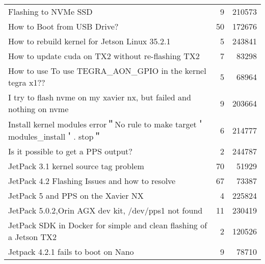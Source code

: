 \begin{longtable}{p{}rr}
    Flashing to NVMe SSD                                                                                                               & 9       & 210573 \\
    How to Boot from USB Drive?                                                                                                        & 50      & 172676 \\
    How to rebuild kernel for Jetson Linux 35.2.1                                                                                      & 5       & 243841 \\
    How to update cuda on TX2 without re-flashing TX2                                                                                  & 7       & 83298  \\
    How to use To use TEGRA\_AON\_GPIO in the kernel tegra x1??                                                                        & 5       & 68964  \\
    I try to flash nvme on my xavier nx, but failed and nothing on nvme                                                                & 9       & 203664 \\
    Install kernel modules error＂No rule to make target＇modules\_install＇. stop＂                                                   & 6       & 214777 \\
    Is it possible to get a PPS output?                                                                                                & 2       & 244787 \\
    JetPack 3.1 kernel source tag problem                                                                                              & 70      & 51929  \\
    JetPack 4.2 Flashing Issues and how to resolve                                                                                     & 67      & 73387  \\
    JetPack 5 and PPS on the Xavier NX                                                                                                 & 4       & 225824 \\
    JetPack 5.0.2,Orin AGX dev kit, /dev/pps1 not found                                                                                & 11      & 230419 \\
    JetPack SDK in Docker for simple and clean flashing of a Jetson TX2                                                                & 2       & 120526 \\
    Jetpack 4.2.1 fails to boot on Nano                                                                                                & 9       & 78710  \\

\end{longtable}
